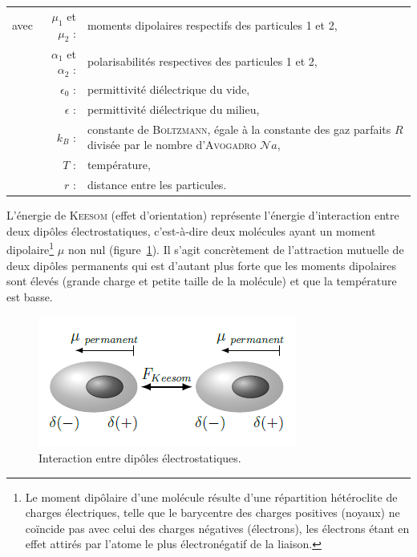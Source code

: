 \begin{flushleft}
\begin{tabular}{@{}lrp{10cm}}
avec & $\mu_{1}$ et $\mu_{2}$ : & moments dipolaires respectifs des particules 1 et 2, \\
& $\alpha_{1}$ et $\alpha_{2}$ : & polarisabilités respectives des particules 1 et 2, \\
& $\epsilon_{0}$ : & permittivité diélectrique du vide, \\
& $\epsilon$ : & permittivité diélectrique du milieu, \\
& $k_{B}$ : & constante de \textsc{Boltzmann}, égale à la constante des gaz parfaits $R$ divisée par le nombre d'\textsc{Avogadro} $\mathcal{N}\!a$, \\
& $T$ : & température, \\
& $r$ : & distance entre les particules. \\
\end{tabular}
\end{flushleft}

L'énergie de \textsc{Keesom} (effet d'orientation) représente l'énergie d'interaction entre deux dipôles électrostatiques, c'est-à-dire deux molécules ayant un moment dipolaire\footnote{Le moment dipôlaire d'une molécule résulte d'une répartition hétéroclite de charges électriques, telle que le barycentre des charges positives (noyaux) ne coïncide pas avec celui des charges négatives (électrons), les électrons étant en effet attirés par l'atome le plus électronégatif de la liaison.} $\mu{}$ non nul (figure~\ref{figKeesom}). Il s'agit concrètement de l'attraction mutuelle de deux dipôles permanents qui est d’autant plus forte que les moments dipolaires sont élevés (grande charge et petite taille de la molécule) et que la température est basse.

\begin{figure}[h]
\centering
\includegraphics[scale=0.5]{image/Keesom}
\caption{Interaction entre dipôles électrostatiques.}
\label{figKeesom}
\end{figure}

